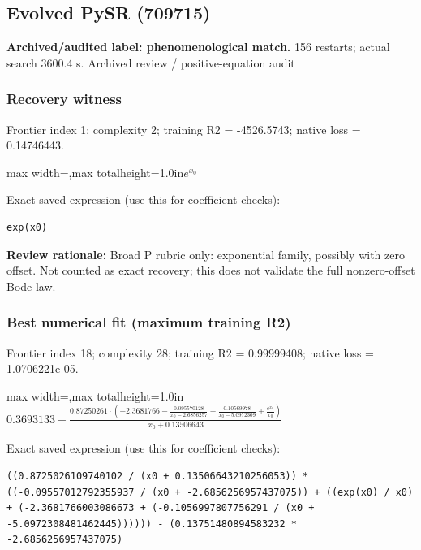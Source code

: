 \documentclass[10pt,letterpaper,landscape]{article}
\begin{document}
\begin{minipage}[t]{0.485\textwidth}
\subsection*{Evolved PySR (709715)}
\textbf{Archived/audited label: phenomenological match.} 156 restarts; actual search 3600.4 s.
{\small Archived review / positive-equation audit}
\subsubsection*{Recovery witness}
Frontier index 1; complexity 2; training R2 = -4526.5743; native loss = 0.14746443.
\begin{center}\begin{adjustbox}{max width=\linewidth,max totalheight=1.0in}$\displaystyle e^{x_{0}}$\end{adjustbox}\end{center}
{\scriptsize Exact saved expression (use this for coefficient checks):}
\begin{lstlisting}
exp(x0)
\end{lstlisting}
{\small\textbf{Review rationale:} Broad P rubric only: exponential family, possibly with zero offset. Not counted as exact recovery; this does not validate the full nonzero-offset Bode law.}
\subsubsection*{Best numerical fit (maximum training R2)}
Frontier index 18; complexity 28; training R2 = 0.99999408; native loss = 1.0706221e-05.
\begin{center}\begin{adjustbox}{max width=\linewidth,max totalheight=1.0in}$\displaystyle 0.3693133 + \frac{0.87250261 \cdot \left(-2.3681766 - \frac{0.095570128}{x_{0} - 2.6856257} - \frac{0.10569978}{x_{0} - 5.0972309} + \frac{e^{x_{0}}}{x_{0}}\right)}{x_{0} + 0.13506643}$\end{adjustbox}\end{center}
{\scriptsize Exact saved expression (use this for coefficient checks):}
\begin{lstlisting}
((0.8725026109740102 / (x0 + 0.13506643210256053)) * ((-0.09557012792355937 / (x0 + -2.6856256957437075)) + ((exp(x0) / x0) + (-2.3681766003086673 + (-0.1056997807756291 / (x0 + -5.0972308481462445)))))) - (0.13751480894583232 * -2.6856256957437075)
\end{lstlisting}
\end{minipage}
\clearpage{}\label{bode-10009}
\end{document}
